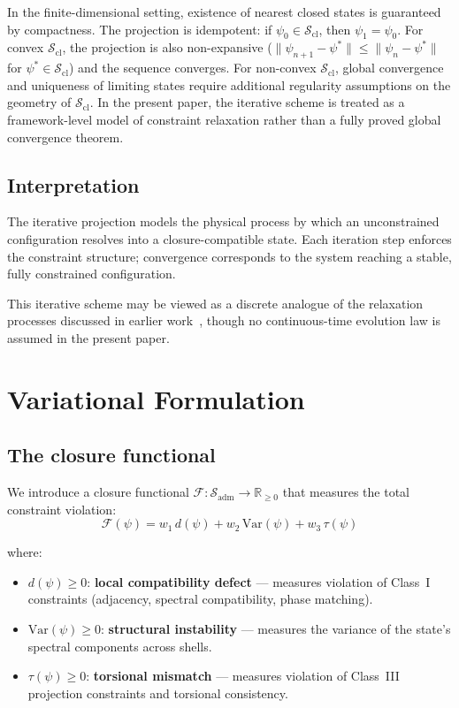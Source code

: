 \documentclass[12pt]{article}
\newcommand{\Fcal}{\mathcal{F}}
\newcommand{\Sadm}{\mathcal{S}_{\mathrm{adm}}}
\newcommand{\Scl}{\mathcal{S}_{\mathrm{cl}}}
\begin{document}
In the finite-dimensional setting, existence of nearest closed states is guaranteed by compactness. The projection is idempotent: if $\psi_0 \in \Scl$, then $\psi_1 = \psi_0$. For convex $\Scl$, the projection is also non-expansive ($\|\psi_{n+1} - \psi^*\| \leq \|\psi_n - \psi^*\|$ for $\psi^* \in \Scl$) and the sequence converges. For non-convex $\Scl$, global convergence and uniqueness of limiting states require additional regularity assumptions on the geometry of $\Scl$. In the present paper, the iterative scheme is treated as a framework-level model of constraint relaxation rather than a fully proved global convergence theorem.

\subsection{Interpretation}

The iterative projection models the physical process by which an unconstrained configuration resolves into a closure-compatible state. Each iteration step enforces the constraint structure; convergence corresponds to the system reaching a stable, fully constrained configuration.

This iterative scheme may be viewed as a discrete analogue of the relaxation processes discussed in earlier work~\citep{SmartBridge}, though no continuous-time evolution law is assumed in the present paper.

\section{Variational Formulation}\label{sec:variational}

\subsection{The closure functional}

We introduce a closure functional $\Fcal : \Sadm \to \mathbb{R}_{\geq 0}$ that measures the total constraint violation:
\begin{equation}\label{eq:functional}
    \Fcal(\psi) = w_1\, d(\psi) + w_2\, \mathrm{Var}(\psi) + w_3\, \tau(\psi)
\end{equation}

where:
\begin{itemize}
    \item $d(\psi) \geq 0$: \textbf{local compatibility defect} --- measures violation of Class~I constraints (adjacency, spectral compatibility, phase matching).
    \item $\mathrm{Var}(\psi) \geq 0$: \textbf{structural instability} --- measures the variance of the state's spectral components across shells.
    \item $\tau(\psi) \geq 0$: \textbf{torsional mismatch} --- measures violation of Class~III projection constraints and torsional consistency.
\end{itemize}
\end{document}

